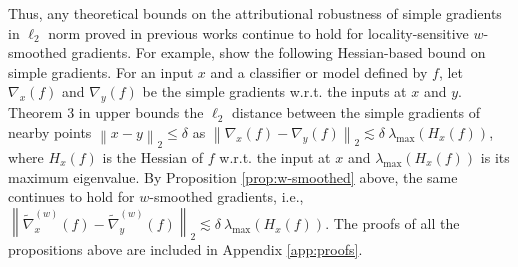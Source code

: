 \documentclass[letterpaper]{article} %
\def\ba{\mathbf{a}}
\newcommand{\norm}[1]{\left\|#1\right\|}
\begin{document}
Thus, any theoretical bounds on the attributional robustness of simple gradients in $\ell_{2}$ norm proved in previous works continue to hold for locality-sensitive $w$-smoothed gradients. For example, \cite{wang2020smoothed} show the following Hessian-based bound on simple gradients. For an input $x$ and a classifier or model defined by $f$, let $\nabla_{x}(f)$ and $\nabla_{y}(f)$ be the simple gradients w.r.t. the inputs at $x$ and $y$. Theorem 3 in \cite{wang2020smoothed} upper bounds the $\ell_{2}$ distance between the simple gradients of nearby points $\norm{x - y}_{2} \leq \delta$ as  $\norm{\nabla_{x}(f) - \nabla_{y}(f)}_{2} \lesssim \delta~ \lambda_{\text{max}}(H_{x}(f))$, where $H_{x}(f)$ is the Hessian of $f$ w.r.t. the input at $x$ and $\lambda_{\text{max}}(H_{x}(f))$ is its maximum eigenvalue. By Proposition \ref{prop:w-smoothed} above, the same continues to hold for $w$-smoothed gradients, i.e., $\norm{\tilde{\nabla}_{x}^{(w)}(f) - \tilde{\nabla}_{y}^{(w)}(f)}_{2} \lesssim \delta~ \lambda_{\text{max}}(H_{x}(f))$. The proofs of all the propositions above are included in Appendix \ref{app:proofs}.
%
\end{document}
